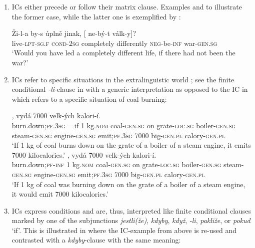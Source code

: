 \documentclass[output=paper,colorlinks,citecolor=brown,
modfonts,newtxmath
]{langscibook}
\begin{document}
\begin{enumerate}
\item ICs either precede or follow their matrix clause. Examples  and  to  illustrate the former case, while the latter one is exemplified by :

\ea\label{ex:war}
\gll Ži-l-a by-s úplně jinak, [\hspace{-2pt} ne-bý-t válk-y]?\\
     live-\textsc{lpt-sg.f} \textsc{cond-2sg} completely differently {} \textsc{neg}-be-\textsc{inf} war-\textsc{gen.sg}\\ 
\glt `Would you have led a completely different life, if there had not been the war?' \hfill \citep[Czech;][7]{Milotova2012}
\z

\item ICs refer to specific situations in the extralinguistic world \citep[77]{Svoboda1960a}; see the finite conditional \textit{-li}-clause in  with a generic interpretation as opposed to the IC in  which refers to a specific situation of coal burning:

\ea\label{ex:kettle}
\ea\label{ex:kettle-a}
, vydá 7000 velk-ých kalori-í.\\ 
     {} {burn.down};\textsc{pf}.\textsc{3sg}$=$if 1 kg.\textsc{nom} coal-\textsc{gen.sg} on grate-\textsc{loc.sg} boiler-\textsc{gen.sg} steam-\textsc{gen.sg} engine-\textsc{gen.sg} emit;\textsc{pf}.\textsc{3sg} 7000 big-\textsc{gen.pl} calory-\textsc{gen.pl}\\
\glt `If 1 kg of coal burns down on the grate of a boiler of a steam engine, it emits 7000 kilocalories.'
\ex\label{ex:kettle-b}
, vydá 7000 velk-ých kalori-í.\\
     {} {burn.down};\textsc{pf}-\textsc{inf} 1 kg.\textsc{nom} coal-\textsc{gen.sg} on grate-\textsc{loc.sg} boiler-\textsc{gen.sg} steam-\textsc{gen.sg} engine-\textsc{gen.sg} emit;\textsc{pf}.\textsc{3sg} 7000 big-\textsc{gen.pl} calory-\textsc{gen.pl}\\
\glt `If 1 kg of coal was burning down on the grate of a boiler of a steam engine, it would emit 7000 kilocalories.' \\ \hfill \citep[Czech;][77]{Svoboda1960a}
\z
\z

\item ICs express conditions and are, thus, interpreted like finite conditional clauses marked by one of the subjunctions \textit{jestli(že)}, \textit{kdyby}, \textit{když}, \textit{-li}, \textit{pakliže}, or \textit{pokud} `if'. This is illustrated in  where the IC-example  from above is re-used and contrasted with a \textit{kdyby}-clause with the same meaning:


\end{enumerate}
\end{document}
